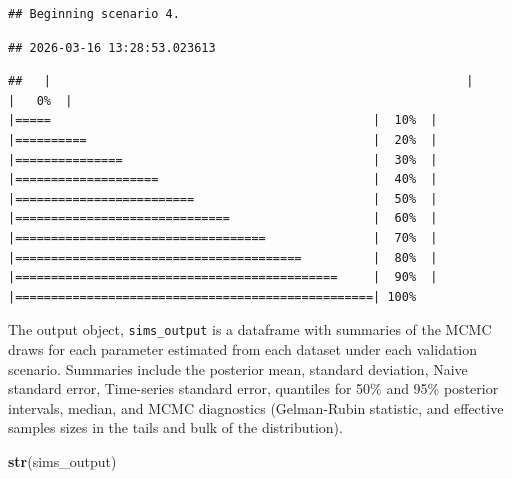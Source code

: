 \documentclass[
]{article}
\newenvironment{Shaded}{\begin{snugshade}}{\end{snugshade}}
\newcommand{\FunctionTok}[1]{\textcolor[rgb]{0.13,0.29,0.53}{\textbf{#1}}}
\newcommand{\NormalTok}[1]{#1}
\begin{document}
\begin{verbatim}
## Beginning scenario 4.
\end{verbatim}

\begin{verbatim}
## 2026-03-16 13:28:53.023613
\end{verbatim}

\begin{verbatim}
##   |                                                          |                                                  |   0%  |                                                          |=====                                             |  10%  |                                                          |==========                                        |  20%  |                                                          |===============                                   |  30%  |                                                          |====================                              |  40%  |                                                          |=========================                         |  50%  |                                                          |==============================                    |  60%  |                                                          |===================================               |  70%  |                                                          |========================================          |  80%  |                                                          |=============================================     |  90%  |                                                          |==================================================| 100%
\end{verbatim}

\linespread{1}

The output object, \texttt{sims\_output} is a dataframe with summaries of the MCMC draws for each parameter estimated from each dataset under each validation scenario. Summaries include the posterior mean, standard deviation, Naive standard error, Time-series standard error, quantiles for 50\% and 95\% posterior intervals, median, and MCMC diagnostics (Gelman-Rubin statistic, and effective samples sizes in the tails and bulk of the distribution).

\linespread{1}

\begin{Shaded}
\begin{Highlighting}[]
\FunctionTok{str}\NormalTok{(sims\_output)}
\end{Highlighting}
\end{Shaded}
\end{document}
